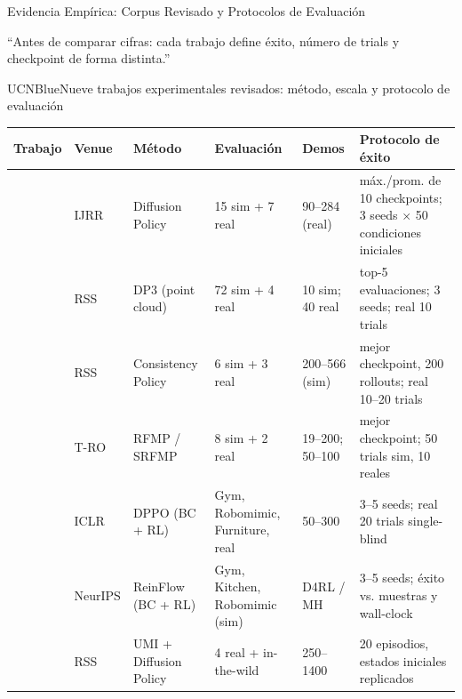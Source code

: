\documentclass[aspectratio=169,10pt,xcolor={dvipsnames,table}]{beamer}
\newcommand{\BannerFont}{\fontsize{7.5}{9.2}\selectfont\bfseries}       %
\newcommand{\BannerArc}{1.5pt}             %
\newcommand{\BannerRule}{0.5pt}            %
\newcommand{\BannerLeftRule}{2.5pt}        %
\newcommand{\BannerCentral}[2][UCNCyan]{%
  \begin{tcolorbox}[
    enhanced,
    colback=#1!10,
    colframe=#1,
    boxrule=\BannerRule,
    leftrule=\BannerLeftRule,
    arc=\BannerArc,
    top=0.35mm, bottom=0.35mm, left=2mm, right=2mm
  ]
    {\BannerFont\raggedright\textcolor{UCNBlue}{#2}\par}
  \end{tcolorbox}%
  \vspace{-2.5mm}%
}
\newcommand{\TabFont}{\fontsize{5.3}{6.4}\selectfont}                    %
\begin{document}
\begin{frame}{Evidencia Empírica: Corpus Revisado y Protocolos de Evaluación}
  \BannerCentral[UCNBlue]{``Antes de comparar cifras: cada trabajo define éxito, número de trials y checkpoint de forma distinta.''}
  \vspace{0.8mm}
  \begin{Card}{UCNBlue}{Nueve trabajos experimentales revisados: método, escala y protocolo de evaluación}
    {\TabFont
    \setlength{\tabcolsep}{1.4pt}
    \renewcommand{\arraystretch}{1.05}
    \begin{tabular}{@{}L{21mm} L{11mm} L{24mm} L{28mm} L{16mm} L{41mm}@{}}
      \toprule
      \textbf{Trabajo} & \textbf{Venue} & \textbf{Método} & \textbf{Evaluación} & \textbf{Demos} & \textbf{Protocolo de éxito} \\
      \midrule
      \cite{chi2025diffusion} & IJRR & Diffusion Policy & 15 sim + 7 real & 90--284 (real) & máx./prom. de 10 checkpoints; 3 seeds $\times$ 50 condiciones iniciales \\
      \cite{ze2024dp3} & RSS & DP3 (point cloud) & 72 sim + 4 real & 10 sim; 40 real & top-5 evaluaciones; 3 seeds; real 10 trials \\
      \cite{prasad2024consistency} & RSS & Consistency Policy & 6 sim + 3 real & 200--566 (sim) & mejor checkpoint, 200 rollouts; real 10--20 trials \\
      \cite{ding2025rfmp} & T-RO & RFMP / SRFMP & 8 sim + 2 real & 19--200; 50--100 & mejor checkpoint; 50 trials sim, 10 reales \\
      \cite{ren2025dppo} & ICLR & DPPO (BC + RL) & Gym, Robomimic, Furniture, real & 50--300 & 3--5 seeds; real 20 trials single-blind \\
      \cite{zhang2025reinflow} & NeurIPS & ReinFlow (BC + RL) & Gym, Kitchen, Robomimic (sim) & D4RL / MH & 3--5 seeds; éxito vs. muestras y wall-clock \\
      \cite{chi2024umi} & RSS & UMI + Diffusion Policy & 4 real + in-the-wild & 250--1400 & 20 episodios, estados iniciales replicados \\

\end{tabular}}
\end{Card}
\end{frame}
\end{document}
